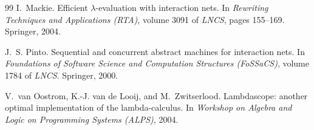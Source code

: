 \documentclass[11pt,a4paper]{article}
\theoremstyle{definition}
\theoremstyle{plain}
\begin{document}
\begin{thebibliography}{99}
I.~Mackie.
\newblock Efficient $\lambda$-evaluation with interaction nets.
\newblock In \emph{Rewriting Techniques and Applications (RTA)}, volume 3091
  of \emph{LNCS}, pages 155--169. Springer, 2004.

J.~S. Pinto.
\newblock Sequential and concurrent abstract machines for interaction nets.
\newblock In \emph{Foundations of Software Science and Computation Structures
  (FoSSaCS)}, volume 1784 of \emph{LNCS}. Springer, 2000.

V.~van Oostrom, K.-J. van de Looij, and M.~Zwitserlood.
\newblock Lambdascope: another optimal implementation of the
  lambda-calculus.
\newblock In \emph{Workshop on Algebra and Logic on Programming Systems
  (ALPS)}, 2004.

\end{thebibliography}
\end{document}
